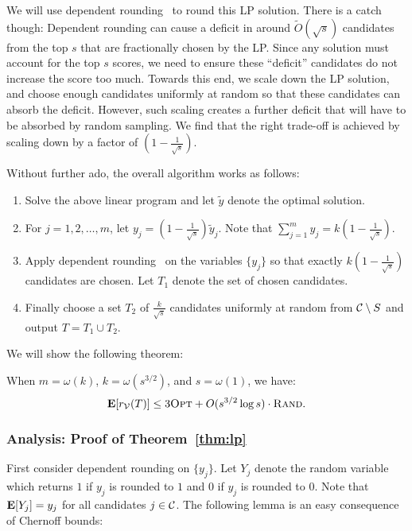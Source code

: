 We will use dependent rounding~\cite{dependent} to round this LP solution. There is a catch though: Dependent rounding can cause a deficit in around $\tilde{O}(\sqrt{s})$ candidates from the top $s$ that are fractionally chosen by the LP. Since any solution must account for the top $s$ scores, we need to ensure these ``deficit'' candidates do not increase the score too much. Towards this end, we scale down the LP solution, and choose enough candidates uniformly at random so that these candidates can absorb the deficit. However, such scaling creates a further deficit that will have to be absorbed by random sampling. We find that the right trade-off is achieved by scaling down by a factor of $(1-\frac{1}{\sqrt{s}})$.

Without further ado, the overall algorithm works as follows:
\begin{enumerate}
    \item Solve the above linear program and let $\tilde{y}$ denote the optimal solution.
    \item For $j = 1,2,\ldots, m$, let $y_j = (1 - \frac{1}{\sqrt{s}}) \tilde{y}_j$. Note that $\sum_{j=1}^m y_j = k (1 - \frac{1}{\sqrt{s}})$.
    \item Apply dependent rounding~\cite{dependent} on the variables $\{y_j\}$ so that exactly $k (1-\frac{1}{\sqrt{s}})$ candidates are chosen. Let $T_1$ denote the set of chosen candidates.
    \item Finally choose a set $T_2$ of $\frac{k}{\sqrt{s}}$ candidates uniformly at random from $\mathcal{C} \setminus S$ and output $T = T_1 \cup T_2$. 
\end{enumerate}

We will show the following theorem:

\begin{theorem}
\label{thm:lp}
When $m = \omega(k)$, $k = \omega(s^{3/2})$, and $s = \omega(1)$, we have:
$$\operatorname{\mathbf{E}}[r_{\mathcal{V}}(T)] \leq 3{\normalfont\textsc{Opt}} +O(s^{3/2}\log s)\cdot {\normalfont\textsc{Rand}}.$$
\end{theorem}


\subsubsection{Analysis: Proof of Theorem~\ref{thm:lp}}
First consider dependent rounding on $\{y_j\}$. Let $Y_j$ denote the random variable which returns $1$ if $y_j$ is rounded to $1$ and $0$ if $y_j$ is rounded to $0$. Note that $\operatorname{\mathbf{E}}[Y_j] = y_j$ for all candidates $j \in \mathcal{C}$. The following lemma is an easy consequence of Chernoff bounds:


